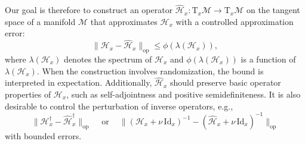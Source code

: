 \documentclass[final,onefignum,onetabnum]{siamart250211}
\begin{document}
Our goal is therefore to construct an operator $\widehat{\mathcal{H}}_x: \mathrm{T}_x\mathcal M \to \mathrm{T}_x\mathcal M$ on the tangent space of a manifold $\mathcal{M}$ that approximates $\mathcal{H}_x$ with a controlled approximation error:
\begin{equation*}
\|\mathcal{H}_x-\widehat{\mathcal{H}}_x\|_{\mathrm{op}} \leq \phi(\lambda(\mathcal{H}_x)),
\end{equation*}
where $\lambda(\mathcal{H}_x)$ denotes the spectrum of $\mathcal{H}_x$ and $\phi(\lambda(\mathcal{H}_x))$ is a function of $\lambda(\mathcal{H}_x)$. When the construction involves randomization, the bound is interpreted in expectation.
Additionally, $\widehat{\mathcal{H}}_x$ should preserve basic operator properties of $\mathcal{H}_x$, such as self-adjointness and positive semidefiniteness.
It is also desirable to control the perturbation of inverse operators, e.g., 
\begin{equation*}
\|\mathcal{H}_x^{\dagger}-\widehat{\mathcal{H}}_x^{\dagger}\|_{\mathrm{op}}\ \quad \mathrm{or}\ \quad 
\big\|(\mathcal{H}_x + \nu\,\mathrm{Id}_x)^{-1}-(\widehat{\mathcal{H}}_x + \nu\,\mathrm{Id}_x)^{-1}\big\|_{\mathrm{op}}
\end{equation*}
with bounded errors. 
\end{document}
